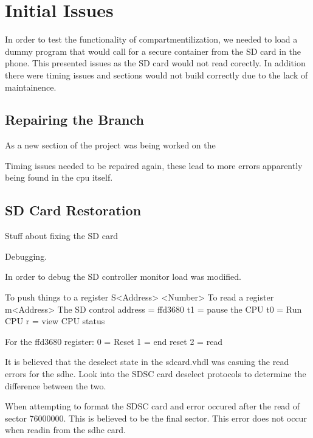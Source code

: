 
\section{Initial Issues}

\label{Ch6 Sec2}

In order to test the functionality of compartmentilization, we needed to load a dummy program that would call for a secure container from the SD card in the phone. This presented issues as the SD card would not read corectly. In addition there were timing issues and sections would not build correctly due to the lack of maintainence.

\subsection{Repairing the Branch}

\label{Ch6 Sec2 Sub1}

As a new section of the project was being worked on the 

Timing issues needed to be repaired again, these lead to more errors apparently being found in the cpu itself.

\subsection{SD Card Restoration}

\label{Ch6 Sec2 Sub2}

Stuff about fixing the SD card

Debugging.

In order to debug the SD controller monitor load was modified.

To push things to a register S<Address> <Number>
To read a register m<Address> 
The SD control address = ffd3680
t1 = pause the CPU
t0 = Run CPU
r = view CPU status

For the ffd3680 register:
0 = Reset
1 = end reset
2 = read

It is believed that the deselect state in the sdcard.vhdl was casuing the read errors for the sdhc. Look into the SDSC card deselect protocols to determine the difference between the two.

When attempting to format the SDSC card and error occured after the read of sector 76000000. This is believed to be the final sector. This error does not occur when readin from the sdhc card.



